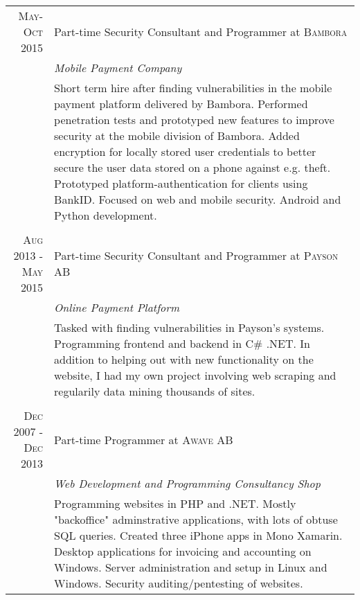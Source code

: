 \documentclass[a4paper,10pt]{article}
\begin{document}
\begin{tabular}{r|p{11cm}}

 \textsc{May-Oct 2015} & Part-time Security Consultant and Programmer at \textsc{Bambora}\\
 &\emph{Mobile Payment Company}\\&\footnotesize{Short term hire after finding vulnerabilities in the 
 mobile payment platform delivered by Bambora. Performed penetration tests and prototyped new 
 features to improve security at the mobile division of Bambora. Added encryption for locally stored 
 user credentials to better secure the user data stored on a phone against e.g. theft. Prototyped 
 platform-authentication for clients using BankID. Focused on web and mobile security. 
 Android and Python development.}\\\multicolumn{2}{c}{} \\
 
\textsc{Aug 2013 - May 2015} & Part-time Security Consultant and Programmer at \textsc{Payson AB}\\
&\emph{Online Payment Platform}
\\&\footnotesize{Tasked with finding vulnerabilities in Payson's systems. 
Programming frontend and backend in C\# .NET. In addition to helping out with new 
functionality on the website, I had my own project involving web scraping and 
regularily data mining thousands of sites.}\\\multicolumn{2}{c}{} \\

\textsc{Dec 2007 - Dec 2013} & Part-time Programmer at \textsc{Awave AB}\\
&\emph{Web Development and Programming Consultancy Shop}
\\&\footnotesize{
Programming websites in PHP and .NET. Mostly "backoffice" adminstrative applications, 
with lots of obtuse SQL queries. Created three iPhone apps in Mono Xamarin. 
Desktop applications for invoicing and accounting on Windows. Server administration 
and setup in Linux and Windows. Security auditing/pentesting of websites. }


\end{tabular}

\end{document}
